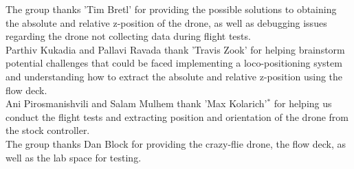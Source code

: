 The group thanks 'Tim Bretl' for providing the possible solutions to obtaining the absolute and relative z-position of the drone, as well as debugging issues regarding the drone not collecting data during flight tests. \\
\indent Parthiv Kukadia and Pallavi Ravada thank 'Travis Zook' for helping brainstorm potential challenges that could be faced implementing a loco-positioning system and understanding how to extract the absolute and relative z-position using the flow deck.\\
\indent Ani Pirosmanishvili and Salam Mulhem thank 'Max Kolarich'$^*$ for helping us conduct the flight tests and extracting position and orientation of the drone from the stock controller. \\
\indent The group thanks Dan Block for providing the crazy-flie drone, the flow deck, as well as the lab space for testing.